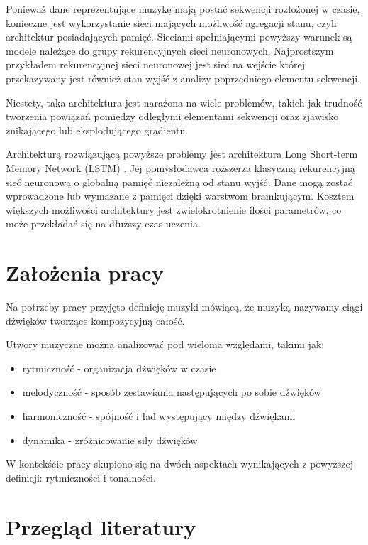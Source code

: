 {{    Ponieważ dane reprezentujące muzykę mają postać sekwencji rozłożonej w\,\,czasie, 
    konieczne jest wykorzystanie sieci mających możliwość agregacji stanu, czyli architektur posiadających pamięć.
    Sieciami spełniającymi powyższy warunek są modele należące do grupy rekurencyjnych sieci neuronowych.
    Najprostszym przykładem rekurencyjnej sieci neuronowej jest sieć na wejście której 
    przekazywany jest również stan wyjść z\,\,analizy poprzedniego elementu sekwencji.
    
    Niestety, taka architektura jest narażona na wiele problemów, takich jak trudność
    tworzenia powiązań pomiędzy odległymi elementami sekwencji oraz zjawisko znikającego lub eksplodującego gradientu.

    Architekturą rozwiązującą powyższe problemy jest architektura
    Long Short-term Memory Network (LSTM) \cite{LongShortTermMemory}. 
    Jej pomysłodawca rozszerza klasyczną rekurencyjną sieć neuronową o\,\,globalną pamięć niezależną
    od stanu wyjść. Dane mogą zostać wprowadzone lub wymazane z\,\,pamięci dzięki warstwom bramkującym. 
    Kosztem większych możliwości architektury jest zwielokrotnienie 
    ilości parametrów, co może przekładać się na dłuższy czas uczenia.
  }

  \newpage

  \section{Założenia pracy}
  {
    Na potrzeby pracy przyjęto definicję muzyki mówiącą, że muzyką nazywamy ciągi 
    dźwięków tworzące kompozycyjną całość. 

    Utwory muzyczne można analizować pod wieloma względami, takimi jak:
    \begin{itemize}
        \setlength\itemsep{-0.5em}
        \item rytmiczność - organizacja dźwięków w\,\,czasie
        \item melodyczność - sposób zestawiania następujących po sobie dźwięków 
        \item harmoniczność - spójność i\,\,ład występujący między dźwiękami
        \item dynamika - zróżnicowanie siły dźwięków
    \end{itemize}

    W\,\,kontekście pracy skupiono się na dwóch aspektach wynikających z\,\,powyższej 
    definicji: rytmiczności i\,\,tonalności.
  }

  \section{Przegląd literatury}
  {

}}
